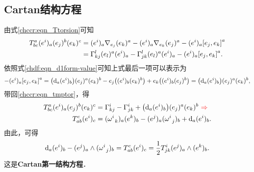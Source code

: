 \subsection{Cartan结构方程}\label{chccr:sec_Cartan-Structure}
由式\eqref{chccr:eqn_Ttorsion}可知
\begin{align}
    T_{bc}^a (e^i)_a (e_j)^b (e_k)^c &= (e^i)_a{\nabla_{e_j}}{(e_k)^a} -
    (e^i)_a{\nabla _{e_k}}{(e_j)^a} - (e^i)_a{\left[ {e_j,e_k} \right]^a} \notag \\
    & = \Gamma_{kj}^l (e_l)^a(e^i)_a - \Gamma_{jk}^l (e_l)^a(e^i)_a-
    (e^i)_a{\left[ {e_j,e_k} \right]^a}.  \label{chccr:eqn_tmptor}
\end{align}
依照式\eqref{chdf:eqn_d1form-value}可知上式最后一项可以表示为
\setlength{\mathindent}{0em}
\begin{align*}
    -(e^i)_a{\left[ {e_j,e_k} \right]^a} =\bigl( {\rm d}_a (e^i)_b \bigr) (e_j)^a (e_k)^b
    -e_j \bigl( (e^i)_b (e_k)^b \bigr) + e_k \bigl( (e^i) _b (e_j)^b \bigr) 
    =\bigl( {\rm d}_a (e^i)_b \bigr) (e_j)^a (e_k)^b ,
\end{align*}\setlength{\mathindent}{2em}
带回\eqref{chccr:eqn_tmptor}，得
\begin{align*}
    T_{bc}^a (e^i)_a (e_j)^b (e_k)^c & = \Gamma_{kj}^i -\Gamma_{jk}^i
    + \bigl( {\rm d}_a (e^i)_b \bigr) (e_j)^a (e_k)^b  {\ \color{red} \Rightarrow }   \\
    T_{ab}^c (e^i)_c  & = (\omega _{\hphantom{a} k}^i)_a(e^k)_b -(e^j)_a(\omega _{\hphantom{a} j}^i)_b
    +  {\rm d}_a (e^i)_b .
\end{align*}
由此，可得
\begin{equation}\label{chccr:eqn_Cartan-Structure-I}
    {\rm d}_a (e^i)_b - (e^j)_a \wedge (\omega _{\hphantom{a} j}^i)_b =T_{ab}^c (e^i)_c
    =\frac{1}{2}T_{jk}^i (e^j)_a \wedge(e^k)_b .
\end{equation}
这是{\heiti \bfseries Cartan第一结构方程}．

